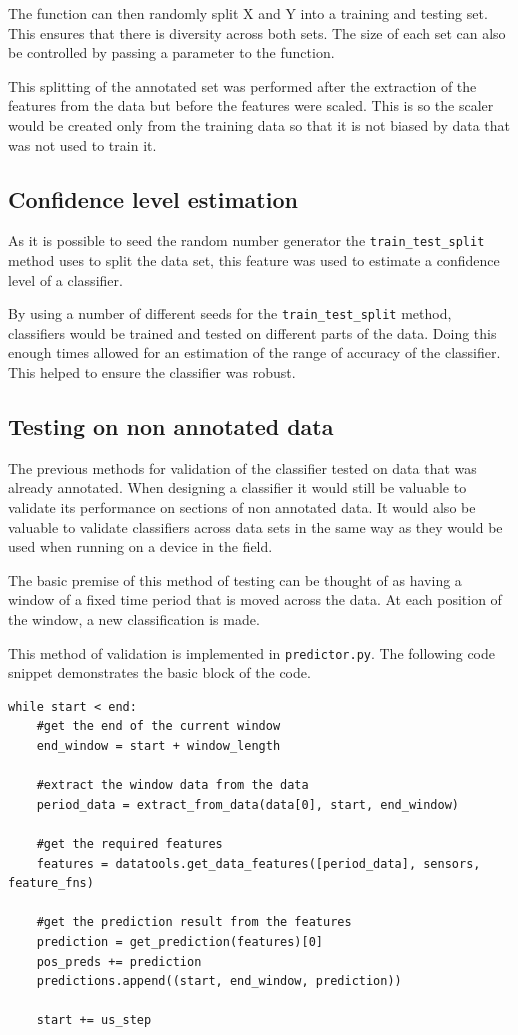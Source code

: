 The function can then randomly split X and Y into a training and testing set. This ensures that there is diversity across both sets. The size of each set can also be controlled by passing a parameter to the function. 

This splitting of the annotated set was performed after the extraction of the features from the data but before the features were scaled. This is so the scaler would be created only from the training data so that it is not biased by data that was not used to train it. 

\subsection{Confidence level estimation}
As it is possible to seed the random number generator the \texttt{train\_test\_split} method uses to split the data set, this feature was used to estimate a confidence level of a classifier.

By using a number of different seeds for the \texttt{train\_test\_split} method, classifiers would be trained and tested on different parts of the data. Doing this enough times allowed for an estimation of the range of accuracy of the classifier. This helped to ensure the classifier was robust. 

\subsection{Testing on non annotated data}
The previous methods for validation of the classifier tested on data that was already annotated. When designing a classifier it would still be valuable to validate its performance on sections of non annotated data. It would also be valuable to validate classifiers across data sets in the same way as they would be used when running on a device in the field. 

The basic premise of this method of testing can be thought of as having a window of a fixed time period that is moved across the data. At each position of the window, a new classification is made. 

This method of validation is implemented in \texttt{predictor.py}. The following code snippet demonstrates the basic block of the code.

\begin{verbatim}
while start < end:
    #get the end of the current window
    end_window = start + window_length
    
    #extract the window data from the data
    period_data = extract_from_data(data[0], start, end_window)
    
    #get the required features
    features = datatools.get_data_features([period_data], sensors, feature_fns)
    
    #get the prediction result from the features
    prediction = get_prediction(features)[0]
    pos_preds += prediction
    predictions.append((start, end_window, prediction))
        
    start += us_step
\end{verbatim}

